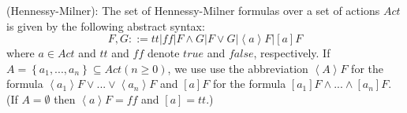 \begin{definition}
(Hennessy-Milner): The set of Hennessy-Milner formulas over a set of actions $Act$ is given by the following abstract syntax:
\begin{equation*}
  F,G::=\mathit{tt} | \mathit{ff} | F\wedge G | F \vee G|\left\langle a \right\rangle F|\left[ a \right] F
\end{equation*}
where $a \in Act$ and $\mathit{tt}$ and $\mathit{ff}$ denote $true$ and $false$, respectively. 
If $A=\left\{ a_{1},...,a_{n} \right\} \subseteq Act \left( n \geq 0\right)$, 
we use use the abbreviation $\left\langle A \right\rangle F$ for the formula 
$\left\langle a_{1} \right\rangle F \vee ... \vee \left\langle a_{n} \right\rangle F$ and 
$\left[ a \right] F$ for the formula 
$\left[ a_{1} \right] F \wedge ... \wedge \left[ a_{n} \right]F$. 
(If $A=\emptyset$ then $\left\langle a\right\rangle F=\mathit{ff}$ and $\left[a\right] = \mathit{tt}$.)
\end{definition}